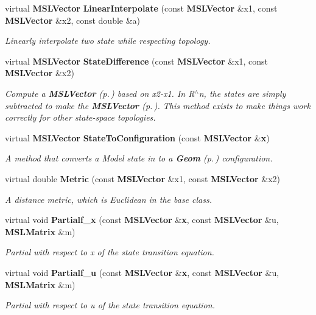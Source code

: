 \begin{CompactItemize}
virtual {\bf MSLVector} {\bf Linear\-Interpolate} (const {\bf MSLVector} \&x1, const {\bf MSLVector} \&x2, const double \&a)
\begin{CompactList}\small\item\em Linearly interpolate two state while respecting topology.\item\end{CompactList}\item 
virtual {\bf MSLVector} {\bf State\-Difference} (const {\bf MSLVector} \&x1, const {\bf MSLVector} \&x2)
\begin{CompactList}\small\item\em Compute a {\bf MSLVector} {\rm (p.\,\pageref{classMSLVector})} based on x2-x1. In R$^\wedge$n, the states are simply subtracted to make the {\bf MSLVector} {\rm (p.\,\pageref{classMSLVector})}. This method exists to make things work correctly for other state-space topologies.\item\end{CompactList}\item 
virtual {\bf MSLVector} {\bf State\-To\-Configuration} (const {\bf MSLVector} \&{\bf x})
\begin{CompactList}\small\item\em A method that converts a Model state in to a {\bf Geom} {\rm (p.\,\pageref{classGeom})} configuration.\item\end{CompactList}\item 
virtual double {\bf Metric} (const {\bf MSLVector} \&x1, const {\bf MSLVector} \&x2)
\begin{CompactList}\small\item\em A distance metric, which is Euclidean in the base class.\item\end{CompactList}\item 
virtual void {\bf Partialf\_\-x} (const {\bf MSLVector} \&{\bf x}, const {\bf MSLVector} \&u, {\bf MSLMatrix} \&m)
\begin{CompactList}\small\item\em Partial with respect to x of the state transition equation.\item\end{CompactList}\item 
virtual void {\bf Partialf\_\-u} (const {\bf MSLVector} \&{\bf x}, const {\bf MSLVector} \&u, {\bf MSLMatrix} \&m)
\begin{CompactList}\small\item\em Partial with respect to u of the state transition equation.\item\end{CompactList}\item 

\end{CompactItemize}
